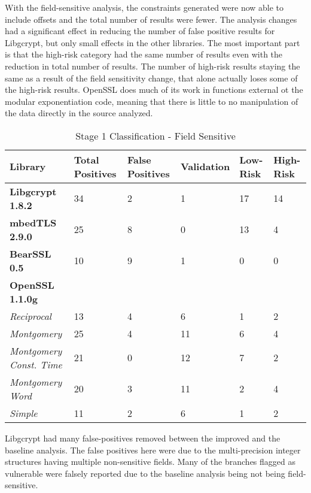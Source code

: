 \documentclass[11pt,a4paper]{article}
\begin{document}
With the field-sensitive analysis, the constraints generated were now able to
include offsets and the total number of results were fewer. The analysis changes
had a significant effect in reducing the number of false positive results for
Libgcrypt, but only small effects in the other libraries. The most important
part is that the high-risk category had the same number of results even with the
reduction in total number of results. The number of high-risk results staying
the same as a result of the field sensitivity change, that alone actually loses
some of the high-risk results. OpenSSL does much of its work in functions
external ot the modular exponentiation code, meaning that there is little to no
manipulation of the data directly in the source analyzed.

\begin{table}
  \begin{tabular}{|p{2.5cm} | p{1.5cm}| p{1.5cm} | p{1.7cm}| p{1.5cm}| p{1.5cm}|}
    \hline
    \textbf{Library} &Total Positives&False Positives&Validation&Low-Risk&High-Risk\\
    \hline
    \textbf{Libgcrypt 1.8.2} & 34 &  2 & 1 & 17 & 14\\
    \textbf{mbedTLS 2.9.0} & 25   & 8  & 0 & 13 & 4 \\
    \textbf{BearSSL 0.5}& 10 & 9 & 1 & 0 & 0 \\
    \textbf{OpenSSL 1.1.0g}& & & & & \\
    \textit{Reciprocal} & 13 & 4  & 6 & 1 & 2 \\
    \textit{Montgomery} & 25 & 4   & 11   & 6  &  4  \\
    \textit{Montgomery Const. Time} & 21 & 0   & 12    &  7   &  2  \\
    \textit{Montgomery Word} & 20 & 3   & 11    & 2    & 4   \\
    \textit{Simple} & 11 & 2    & 6    & 1    & 2   \\
    \hline
  \end{tabular}
  \caption{Stage 1 Classification - Field Sensitive}
  \label{tbl:first-stage-with-offset}
\end{table}


 Libgcrypt had many false-positives removed between the improved and the
 baseline analysis. The false positives here were due to the multi-precision
 integer structures having multiple non-sensitive fields. Many of the branches
 flagged as vulnerable were falsely reported due to the baseline analysis being
 not being field-sensitive.
\end{document}
